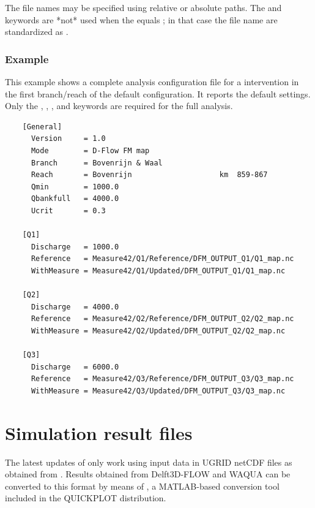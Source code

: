 The file names may be specified using relative or absolute paths.
The  and  keywords are *not* used when the  equals ; in that case the file name are standardized as .

\subsubsection*{Example}

This example shows a complete analysis configuration file for a intervention in the first branch/reach of the default  configuration.
It reports the default settings.
Only the , , ,  and  keywords are required for the full analysis.

\begin{Verbatim}
    [General]
      Version     = 1.0
      Mode        = D-Flow FM map
      Branch      = Bovenrijn & Waal
      Reach       = Bovenrijn                    km  859-867
      Qmin        = 1000.0
      Qbankfull   = 4000.0
      Ucrit       = 0.3
    
    [Q1]
      Discharge   = 1000.0
      Reference   = Measure42/Q1/Reference/DFM_OUTPUT_Q1/Q1_map.nc
      WithMeasure = Measure42/Q1/Updated/DFM_OUTPUT_Q1/Q1_map.nc
    
    [Q2]
      Discharge   = 4000.0
      Reference   = Measure42/Q2/Reference/DFM_OUTPUT_Q2/Q2_map.nc
      WithMeasure = Measure42/Q2/Updated/DFM_OUTPUT_Q2/Q2_map.nc
    
    [Q3]
      Discharge   = 6000.0
      Reference   = Measure42/Q3/Reference/DFM_OUTPUT_Q3/Q3_map.nc
      WithMeasure = Measure42/Q3/Updated/DFM_OUTPUT_Q3/Q3_map.nc
\end{Verbatim}


\section{Simulation result files}

The latest updates of \dfastmi only work using input data in UGRID netCDF files as obtained from \dflowfm.
Results obtained from Delft3D-FLOW and WAQUA can be converted to this format by means of , a MATLAB-based conversion tool included in the QUICKPLOT distribution.

